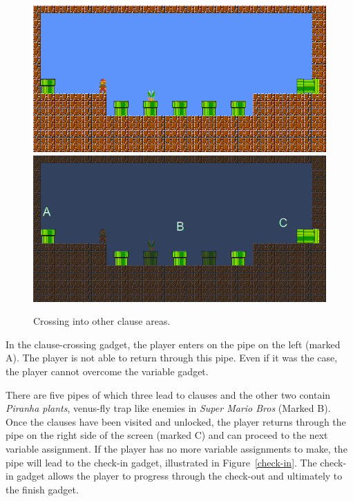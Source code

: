 \documentclass[11pt, a4paper, oneside]{report} %
\begin{document}
\begin{figure}[ht!]

  \centering
    \includegraphics[scale=0.70]{clause}
    \includegraphics[scale=0.70]{clause-explain}
  \caption{Crossing into other clause areas.}
  \label{clause-crossing}
\end{figure}



In the clause-crossing gadget, the player enters on the pipe on the left (marked
A). The player is not able to return through this pipe. Even if it was the case,
the player cannot overcome the variable gadget.

There are five pipes of which three lead to clauses and the other two contain
\textit{Piranha plants}, venus-fly trap like enemies in \textit{Super Mario
Bros} (Marked B). Once the clauses have been visited and unlocked, the player
returns through the pipe on the right side of the screen (marked C) and can
proceed to the next variable assignment. If the player has no more variable
assignments to make, the pipe will lead to the check-in gadget, illustrated in
Figure~\ref{check-in}. The check-in gadget allows the player to progress through
the check-out and ultimately to the finish gadget.
\end{document}
